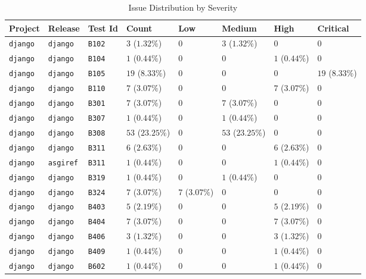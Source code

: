 \begin{table}
\caption{Issue Distribution by Severity}
\label{tab:issue-distribution}
\begin{tabular}{llllllll}
\toprule
Project & Release & Test Id & Count & Low & Medium & High & Critical \\
\midrule
\texttt{django} & \texttt{django} & \texttt{B102} & $3$ ($1.32\%$) & $0$ & $3$ ($1.32\%$) & $0$ & $0$ \\
\texttt{django} & \texttt{django} & \texttt{B104} & $1$ ($0.44\%$) & $0$ & $0$ & $1$ ($0.44\%$) & $0$ \\
\texttt{django} & \texttt{django} & \texttt{B105} & $19$ ($8.33\%$) & $0$ & $0$ & $0$ & $19$ ($8.33\%$) \\
\texttt{django} & \texttt{django} & \texttt{B110} & $7$ ($3.07\%$) & $0$ & $0$ & $7$ ($3.07\%$) & $0$ \\
\texttt{django} & \texttt{django} & \texttt{B301} & $7$ ($3.07\%$) & $0$ & $7$ ($3.07\%$) & $0$ & $0$ \\
\texttt{django} & \texttt{django} & \texttt{B307} & $1$ ($0.44\%$) & $0$ & $1$ ($0.44\%$) & $0$ & $0$ \\
\texttt{django} & \texttt{django} & \texttt{B308} & $53$ ($23.25\%$) & $0$ & $53$ ($23.25\%$) & $0$ & $0$ \\
\texttt{django} & \texttt{django} & \texttt{B311} & $6$ ($2.63\%$) & $0$ & $0$ & $6$ ($2.63\%$) & $0$ \\
\texttt{django} & \texttt{asgiref} & \texttt{B311} & $1$ ($0.44\%$) & $0$ & $0$ & $1$ ($0.44\%$) & $0$ \\
\texttt{django} & \texttt{django} & \texttt{B319} & $1$ ($0.44\%$) & $0$ & $1$ ($0.44\%$) & $0$ & $0$ \\
\texttt{django} & \texttt{django} & \texttt{B324} & $7$ ($3.07\%$) & $7$ ($3.07\%$) & $0$ & $0$ & $0$ \\
\texttt{django} & \texttt{django} & \texttt{B403} & $5$ ($2.19\%$) & $0$ & $0$ & $5$ ($2.19\%$) & $0$ \\
\texttt{django} & \texttt{django} & \texttt{B404} & $7$ ($3.07\%$) & $0$ & $0$ & $7$ ($3.07\%$) & $0$ \\
\texttt{django} & \texttt{django} & \texttt{B406} & $3$ ($1.32\%$) & $0$ & $0$ & $3$ ($1.32\%$) & $0$ \\
\texttt{django} & \texttt{django} & \texttt{B409} & $1$ ($0.44\%$) & $0$ & $0$ & $1$ ($0.44\%$) & $0$ \\
\texttt{django} & \texttt{django} & \texttt{B602} & $1$ ($0.44\%$) & $0$ & $0$ & $1$ ($0.44\%$) & $0$ \\

\end{tabular}
\end{table}
